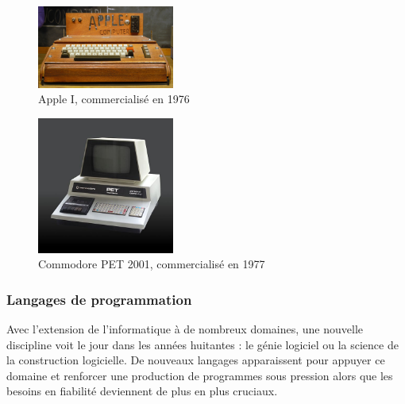 \documentclass[a4paper,11pt]{book}
\begin{document}
\begin{figure}[h]
    \centering
    \includegraphics[width=0.4\textwidth]{media/machines/1920px-Apple_I_Computer.jpeg}
    \caption{Apple I, commercialisé en 1976}
    \label{AppleI}
\end{figure}

\begin{figure}[h]
    \centering
    \includegraphics[width=0.4\textwidth]{media/machines/520px-Commodore_2001_Series-IMG_0448b.jpeg}
    \caption{Commodore PET 2001, commercialisé en 1977}
    \label{PET}
\end{figure}

\subsubsection{Langages de programmation}
Avec l'extension de l'informatique à de nombreux domaines, une nouvelle discipline voit le jour dans les années huitantes : le génie logiciel ou la science de la construction logicielle. De nouveaux langages apparaissent pour appuyer ce domaine et renforcer une production de programmes sous pression alors que les besoins en fiabilité deviennent de plus en plus cruciaux.
\end{document}
